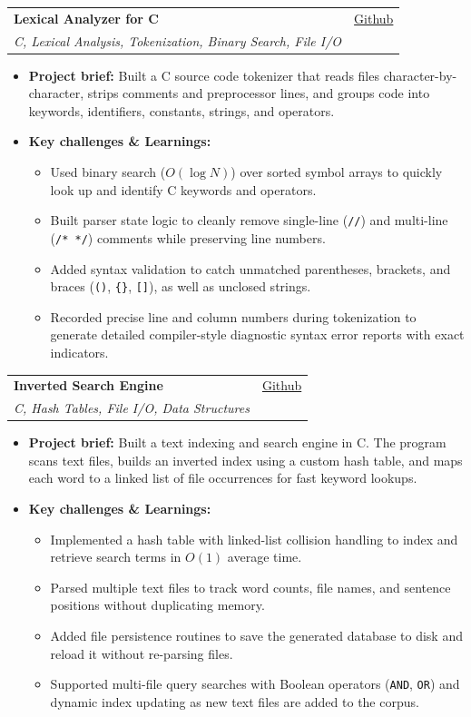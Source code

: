 \documentclass[letterpaper,11pt]{article}
\makeatletter
\newcommand{\resumeItem}[1]{
  \item
    {#1 \vspace{-3pt}}
}
\newcommand{\resumeSubheading}[4]{
  \vspace{-3pt}\item
    \begin{tabular*}{0.97\textwidth}[t]{l@{\extracolsep{\fill}}r}
      \textbf{#1} & #2 \\
      \textit{#3} & {#4} \\
    \end{tabular*}\vspace{-8pt}
}
\newcommand{\resumeItemListStart}{\begin{itemize}[topsep=1pt, itemsep=0.5pt, parsep=0pt]}
\newcommand{\resumeItemListEnd}{\end{itemize}\vspace{-6pt}}
\makeatother
\begin{document}
    \resumeSubheading
      {Lexical Analyzer for C}{\href{https://github.com/k0-R0/Lexical-Analyzer}{Github}}
      {C, Lexical Analysis, Tokenization, Binary Search, File I/O}{}
      \resumeItemListStart
        \resumeItem{\textbf{Project brief:} Built a C source code tokenizer that reads files character-by-character, strips comments and preprocessor lines, and groups code into keywords, identifiers, constants, strings, and operators.}
        \resumeItem{\textbf{Key challenges \& Learnings:}}
        \resumeItemListStart
            \resumeItem{Used binary search ($O(\log N)$) over sorted symbol arrays to quickly look up and identify C keywords and operators.}
            \resumeItem{Built parser state logic to cleanly remove single-line (\texttt{//}) and multi-line (\texttt{/* */}) comments while preserving line numbers.}
            \resumeItem{Added syntax validation to catch unmatched parentheses, brackets, and braces (\texttt{()}, \texttt{\{\}}, \texttt{[]}), as well as unclosed strings.}
            \resumeItem{Recorded precise line and column numbers during tokenization to generate detailed compiler-style diagnostic syntax error reports with exact indicators.}
        \resumeItemListEnd
      \resumeItemListEnd

    \resumeSubheading
      {Inverted Search Engine}{\href{https://github.com/k0-R0/Inverted_SearchEngine}{Github}}
      {C, Hash Tables, File I/O, Data Structures}{}
      \resumeItemListStart
        \resumeItem{\textbf{Project brief:} Built a text indexing and search engine in C. The program scans text files, builds an inverted index using a custom hash table, and maps each word to a linked list of file occurrences for fast keyword lookups.}
        \resumeItem{\textbf{Key challenges \& Learnings:}}
        \resumeItemListStart
            \resumeItem{Implemented a hash table with linked-list collision handling to index and retrieve search terms in $O(1)$ average time.}
            \resumeItem{Parsed multiple text files to track word counts, file names, and sentence positions without duplicating memory.}
            \resumeItem{Added file persistence routines to save the generated database to disk and reload it without re-parsing files.}
            \resumeItem{Supported multi-file query searches with Boolean operators (\texttt{AND}, \texttt{OR}) and dynamic index updating as new text files are added to the corpus.}
        \resumeItemListEnd
      \resumeItemListEnd
\end{document}
